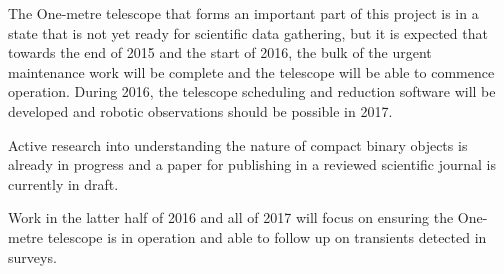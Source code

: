 \documentclass[a4paper,fleqn,usenatbib]{mnras}
\begin{document}
The One-metre telescope that forms an important part of this project is in a state that is not yet ready for scientific data gathering, but it is expected that towards the end of 2015 and the start of 2016, the bulk of the urgent maintenance work will be complete and the telescope will be able to commence operation. During 2016, the telescope scheduling and reduction software will be developed and robotic observations should be possible in 2017.

Active research into understanding the nature of compact binary objects is already in progress and a paper for publishing in a reviewed scientific journal is currently in draft.

Work in the latter half of 2016 and all of 2017 will focus on ensuring the One-metre telescope is in operation and able to follow up on transients detected in surveys.






 










\bsp	%
\label{lastpage}
\end{document}
